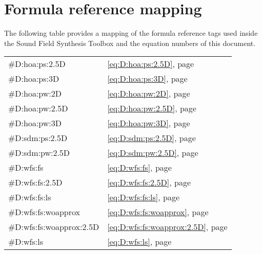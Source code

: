 \def \GITHUB {\GITHUBBASE/03_formula}

\chapter{Formula reference mapping}
\label{cha:formula}
%
The following table provides a mapping of the formula reference tags used
inside the Sound Field Synthesis Toolbox and the equation numbers of this
document.

\begin{longtable}{ll}
    \#D:hoa:ps:2.5D           & \eqref{eq:D:hoa:ps:2.5D},             page \pageref{eq:D:hoa:ps:2.5D} \\
    \#D:hoa:ps:3D             & \eqref{eq:D:hoa:ps:3D},               page \pageref{eq:D:hoa:ps:3D} \\
    \#D:hoa:pw:2D             & \eqref{eq:D:hoa:pw:2D},               page \pageref{eq:D:hoa:pw:2D} \\
    \#D:hoa:pw:2.5D           & \eqref{eq:D:hoa:pw:2.5D},             page \pageref{eq:D:hoa:pw:2.5D} \\
    \#D:hoa:pw:3D             & \eqref{eq:D:hoa:pw:3D},               page \pageref{eq:D:hoa:pw:3D} \\
    \#D:sdm:ps:2.5D           & \eqref{eq:D:sdm:ps:2.5D},             page \pageref{eq:D:sdm:ps:2.5D} \\
    \#D:sdm:pw:2.5D           & \eqref{eq:D:sdm:pw:2.5D},             page \pageref{eq:D:sdm:pw:2.5D} \\
    \#D:wfs:fs                & \eqref{eq:D:wfs:fs},                  page \pageref{eq:D:wfs:fs} \\
    \#D:wfs:fs:2.5D           & \eqref{eq:D:wfs:fs:2.5D},             page \pageref{eq:D:wfs:fs:2.5D} \\
    \#D:wfs:fs:ls             & \eqref{eq:D:wfs:fs:ls},               page \pageref{eq:D:wfs:fs:ls} \\
    \#D:wfs:fs:woapprox       & \eqref{eq:D:wfs:fs:woapprox},         page \pageref{eq:D:wfs:fs:woapprox} \\
    \#D:wfs:fs:woapprox:2.5D  & \eqref{eq:D:wfs:fs:woapprox:2.5D},    page \pageref{eq:D:wfs:fs:woapprox:2.5D} \\
    \#D:wfs:ls                & \eqref{eq:D:wfs:ls},                  page \pageref{eq:D:wfs:ls} \\

\end{longtable}
